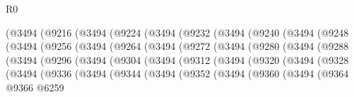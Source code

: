 \begin{lexlean}{R0}
\begin{coremodule}
              (@3494
                (@9216
                  (@3494
                    (@9224
                      (@3494
                        (@9232
                          (@3494
                            (@9240
                              (@3494
                                (@9248
                                  (@3494
                                    (@9256
                                      (@3494
                                        (@9264
                                          (@3494
                                            (@9272
                                              (@3494
                                                (@9280
                                                  (@3494
                                                    (@9288
                                                      (@3494
                                                        (@9296
                                                          (@3494
                                                            (@9304
                                                              (@3494
                                                                (@9312
                                                                  (@3494
                                                                    (@9320
                                                                      (@3494
                                                                        (@9328
                                                                          (@3494
                                                                            (@9336
                                                                              (@3494
                                                                                (@9344
                                                                                  (@3494
                                                                                    (@9352
                                                                                      (@3494
                                                                                        (@9360
                                                                                          (@3494
                                                                                            (@9364
                                                                                              @9366
                                                                                              @6259

\end{coremodule}
\end{lexlean}
